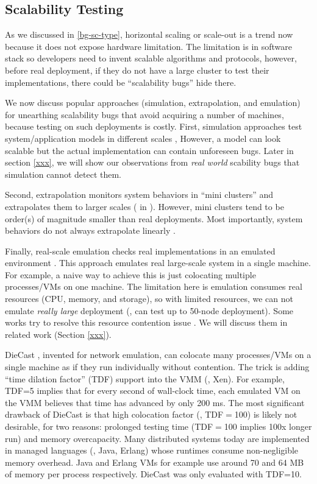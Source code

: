 \subsection{Scalability Testing}

As we discussed in \ref{bg-sc-type}, horizontal scaling or scale-out is a trend
now because it does not expose hardware limitation. The limitation is in
software stack so developers need to invent scalable algorithms and protocols,
however, before real deployment, if they do not have a large cluster to test
their implementations, there could be ``scalability bugs'' hide there.

We now discuss popular approaches (simulation, extrapolation, and emulation) for
unearthing scalability bugs that avoid acquiring a number of machines, because
testing on such deployments is costly.
First, simulation approaches test system/application models in different scales
\cite{Calotoiu+13-ApmScaleBug, Laguna+15-DebugAtScale}, However, a model can
look scalable but the actual implementation can contain unforeseen bugs. Later
in section \ref{xxx}, we will show our observations from \textit{real world}
scability bugs that simulation cannot detect them.

Second, extrapolation monitors system behaviors in ``mini clusters'' and
extrapolates them to larger scales ( in \cite{Wang+14-Exalt}). However,
mini clusters tend to be order(s) of magnitude smaller than real deployments.
Most importantly, system behaviors do not always extrapolate linearly
\cite{Wang+14-Exalt}. 

Finally, real-scale emulation checks real implementations in an emulated
environment \cite{Gupta+08-DieCast, Wang+14-Exalt}. This approach emulates real
large-scale system in a single machine. For example, a naive way to achieve this
is just colocating multiple processes/VMs on one machine. The limitation here is
emulation consumes real resources (CPU, memory, and storage), so with limited
resources, we can not emulate \textit{really large} deployment (\eg, can test up
to 50-node deployment). Some works try to resolve this resource contention issue
\cite{Gupta+08-DieCast, Wang+14-Exalt}. We will discuss them in related work
(Section \ref{xxx}).

DieCast \cite{Gupta+08-DieCast}, invented for network emulation, can colocate
many processes/VMs on a single machine as if they run individually without
contention.  The trick is adding ``time dilation factor'' (TDF) support
\cite{Gupta+06-TimeDilation} into the VMM (\eg, Xen).  For example, TDF=5
implies that for every second of wall-clock time, each emulated VM on the VMM
believes that time has advanced by only 200 ms.  The most significant drawback
of DieCast is that high colocation factor (\eg, TDF$=$100) is likely not
desirable, for two reasons: prolonged testing time (TDF$=$100 implies 100x
longer run) and memory overcapacity.  Many distributed systems today are
implemented in managed languages (\eg, Java, Erlang) whose runtimes consume
non-negligible memory overhead. Java and Erlang VMs for example use around 70
and 64 MB of memory per process respectively.  DieCast was only evaluated with
TDF=10.

